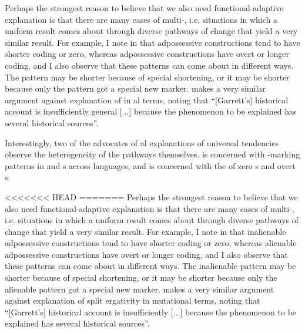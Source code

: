 \documentclass[output=paper]{langsci/langscibook}
\begin{document}
Perhaps the strongest reason to believe that we also need functional-adaptive explanation is that there are many cases of multi-, i.e. situations in which a uniform result comes about through diverse pathways of change that yield a very similar result. For example, I note in \citet{Haspelmath2017} that  adpossessive constructions tend to have shorter coding or zero, whereas  adpossessive constructions have overt or longer coding, and I also observe that these patterns can come about in different ways. The  pattern may be shorter because of special shortening, or it may be shorter because only the  pattern got a special new marker. \citet[37]{Kiparsky2008} makes a very similar argument against  explanation of  in al terms, noting that “[Garrett’s] historical account is insufficiently general [...] because the phenomenon to be explained has several historical sources”.

Interestingly, two of the advocates of al explanations of universal tendencies observe the heterogeneity of the pathways themselves. \citet{Anderson2016} is concerned with -marking patterns in  and  s across languages, and \citet{Cristofaro2017} is concerned with the  of zero s and overt s:

<<<<<<< HEAD
=======
Perhaps the strongest reason to believe that we also need functional-adaptive explanation is that there are many cases of multi-, i.e. situations in which a uniform result comes about through diverse pathways of change that yield a very similar result. For example, I note in \citet{Haspelmath2017} that inalienable adpossessive constructions tend to have shorter coding or zero, whereas alienable adpossessive constructions have overt or longer coding, and I also observe that these patterns can come about in different ways. The inalienable pattern may be shorter because of special shortening, or it may be shorter because only the alienable pattern got a special new marker. \citet[37]{Kiparsky2008} makes a very similar argument against  explanation of split ergativity in mutational terms, noting that “[Garrett’s] historical account is insufficiently  [...] because the phenomenon to be explained has several historical sources”.
\end{document}
